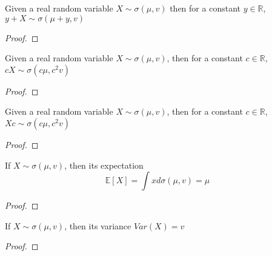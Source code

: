 \begin{lemma}\label{lem:semicircleReal_const_add}
  \mathlibok
  Given a real random variable $X \sim \sigma(\mu, v)$
  then for a constant $y \in \mathbb{R}$, $y + X \sim \sigma(\mu + y, v)$
  \begin{proof}

  \end{proof}
\end{lemma}


\begin{lemma}\label{lem:semicircleReal_const_mul}
  \mathlibok
  Given a real random variable $X \sim \sigma(\mu, v)$,
  then for a constant $c \in \mathbb{R}$, $cX \sim \sigma(c\mu , c^2v)$
  \begin{proof}

  \end{proof}
\end{lemma}


\begin{lemma}\label{lem:semicircleReal_mul_const}
  \mathlibok
   Given a real random variable $X \sim \sigma(\mu, v)$,
  then for a constant $c \in \mathbb{R}$, $Xc \sim \sigma(c \mu  , c^2v)$
  \begin{proof}

  \end{proof}
\end{lemma}




\begin{lemma}\label{lem:integral_id_semicircleReal}
  \notready
  If $X \sim \sigma(\mu, v)$, then its expectation $$\mathbb{E}[X] = \int x d \sigma(\mu, v) = \mu$$
  \begin{proof}
  \end{proof}
\end{lemma}

\begin{lemma}\label{lem:variance_fun_id_semicircleReal}
  \notready
  If $X \sim \sigma(\mu, v)$, then its variance $Var(X) = v$
  \begin{proof}
  \end{proof}
\end{lemma}


